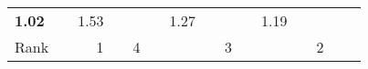 \begin{tabular}{ll|rrrrrr|rrrrrrr}
  
  \textbf{1.02} &  & 1.53 &  &  &  & 1.27 &  &  &  & 1.19 \\

  Rank & &
  1 &  & 4 &  &  &  & 3 &  &  &  & 2 \\\hline\hline
  

\end{tabular}
